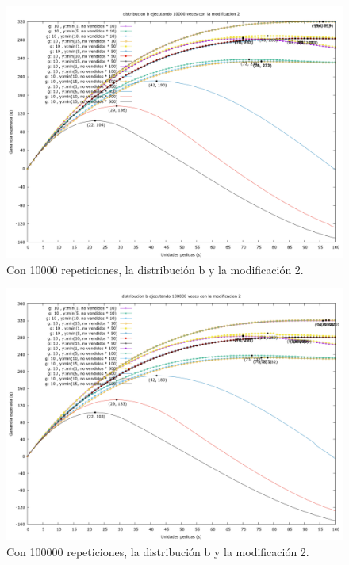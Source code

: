 \documentclass[12pt, spanish]{article}
\begin{document}
\begin{figure}[H]
	\centering
	\includegraphics[scale = 0.2]{prob_b/datos_b_10000_2.png}
	\caption{Con 10000 repeticiones, la distribución b y la modificación 2.}
	\label{fig:ej1_a_10000}

\end{figure}

\begin{figure}[H]
	\centering
	\includegraphics[scale = 0.2]{prob_b/datos_b_100000_2.png}
	\caption{Con 100000 repeticiones, la distribución b y la modificación 2.}
	\label{fig:ej1_a_100000}

\end{figure}
\end{document}
